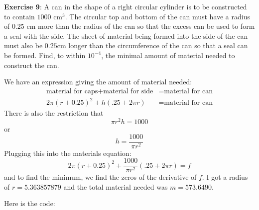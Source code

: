 \documentclass{article}
\begin{document}
\textbf{Exercise 9}: A can in the shape of a right circular cylinder is to be constructed to contain $1000\text{ cm}^{3}$. The circular top and bottom of the can must have a radius of $0.25$ cm more than the radius of the can so that the excess can be used to form a seal with the side. The sheet of material being formed into the side of the can must also be $0.25 \text{cm}$ longer than the circumference of the can so that a seal can be formed. Find, to within $10^{-4}$, the minimal amount of material needed to construct the can.
    \begin{answer}
        We have an expression giving the amount of material needed:
            \begin{align*}
                \text{material for caps} + \text{material for side} &= \text{material for can} \\
                2\pi(r + 0.25)^{2} + h(.25 + 2\pi r)                &= \text{material for can}   
            \end{align*}
        There is also the restriction that  
            \begin{equation*}
                \pi r^{2} h = 1000
            \end{equation*}
        or
            \begin{equation*}
                h = \dfrac{1000}{\pi r^{2}}
            \end{equation*}
        Plugging this into the materials equation:
            \begin{equation*}
                2\pi (r + 0.25)^{2} + \dfrac{1000}{\pi r^{2}}(.25 + 2\pi r) = f
            \end{equation*}
        and to find the minimum, we find the zeros of the derivative of $f$. I got a radius of $r = 5.363857879$ and the total material needed was $m = 573.6490$.

        Here is the code:
        \inputminted{matlab}{code/newton/newton.m}
        \inputminted{matlab}{code/script9.m}
    \end{answer}
\end{document}
